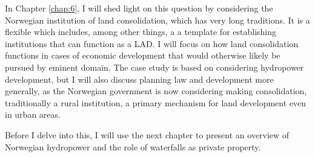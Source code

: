 In Chapter \ref{chap:6}, I will shed light on this question by considering the Norwegian institution of land consolidation, which has very long traditions. It is a flexible  which includes, among other things, a a template for establishing institutions that can function as a LAD. I will focus on how land consolidation functions in cases of economic development that would otherwise likely be pursued by eminent domain. The case study is based on considering hydropower development, but I will also discuss planning law and development more generally, as the Norwegian government is now considering making consolidation, traditionally a rural institution, a primary mechanism for land development even in urban areas.

Before I delve into this, I will use the next chapter to present an overview of Norwegian hydropower and the role of waterfalls as private property.